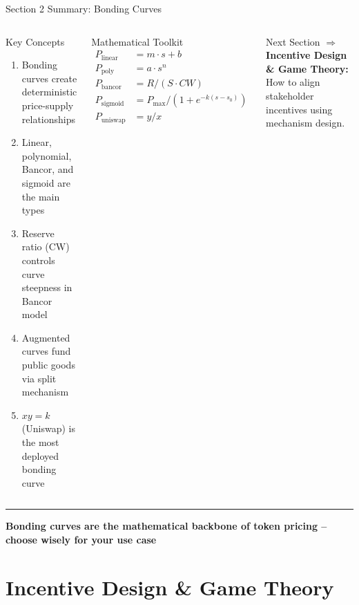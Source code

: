 \documentclass[8pt,aspectratio=169]{beamer}
\newcommand{\bottomnote}[1]{\vfill\vspace{-2mm}\textcolor{mllavender2}{\rule{\textwidth}{0.4pt}}\vspace{1mm}\footnotesize\textbf{#1}}
\begin{document}
\begin{frame}{Section 2 Summary: Bonding Curves}
\begin{columns}[T]
\begin{block}{Key Concepts}
\footnotesize
\begin{enumerate}
  \item Bonding curves create deterministic price-supply relationships
  \item Linear, polynomial, Bancor, and sigmoid are the main types
  \item Reserve ratio (CW) controls curve steepness in Bancor model
  \item Augmented curves fund public goods via split mechanism
  \item $xy = k$ (Uniswap) is the most deployed bonding curve
\end{enumerate}
\end{block}

\begin{block}{Mathematical Toolkit}
\footnotesize
\begin{align}
P_{\text{linear}} &= m \cdot s + b \\
P_{\text{poly}} &= a \cdot s^n \\
P_{\text{bancor}} &= R / (S \cdot CW) \\
P_{\text{sigmoid}} &= P_{\max}/(1 + e^{-k(s-s_0)}) \\
P_{\text{uniswap}} &= y / x
\end{align}
\end{block}
\vspace{2mm}
\begin{exampleblock}{\footnotesize Next Section}
\footnotesize
$\Rightarrow$ \textbf{Incentive Design \& Game Theory:} How to align stakeholder incentives using mechanism design.
\end{exampleblock}
\end{columns}
\bottomnote{Bonding curves are the mathematical backbone of token pricing -- choose wisely for your use case}
\end{frame}

\section{Incentive Design \& Game Theory}
\end{document}
